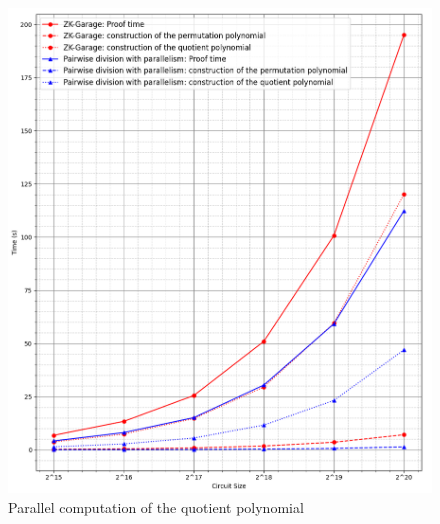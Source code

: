 \begin{figure}
    \centering
    \includegraphics[width=1\linewidth]{figures//optimizations/parallel.png}
    \caption{Parallel computation of the quotient polynomial}
    \label{fig:parallelized}
\end{figure}
